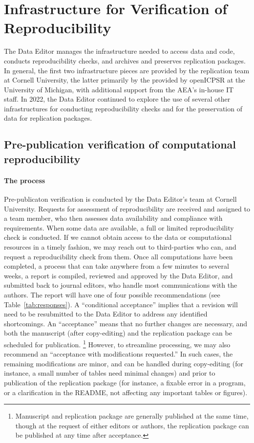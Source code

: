 
\section{Infrastructure for Verification of Reproducibility}
\label{sec:infrastructure}

The Data Editor manages the infrastructure needed to access data and code, conducts reproducibility checks, and archives and preserves replication packages. In general, the first two infrastructure pieces are provided by the replication team at Cornell University, the latter primarily by the  \aeadcr{} provided by openICPSR at the University of Michigan, with additional support from the AEA's in-house IT staff. In 2022, the Data Editor continued to explore the use of several other infrastructures for  conducting reproducibility checks and for the preservation of data for replication packages.


\subsection{Pre-publication verification of computational reproducibility}
\label{sec:verification}

\paragraph{The process}

Pre-publicaton verification is conducted by the Data Editor's team at Cornell University. 
Requests for assessment of reproducibility are received and assigned to a team member, who then assesses data availability and compliance with requirements. When some data are available, a full or limited reproducibility check is conducted. If we cannot obtain access to the data or computational resources in a timely fashion, we may reach out to third-parties who can, and request a reproducibility check from them. Once all computations have been completed, a process that can take anywhere from a few minutes to several weeks, a report is compiled, reviewed and approved by the Data Editor, and submitted back to journal editors, who handle most communications with the authors. The report will have  one of four possible recommendations (see Table~\ref{tab:responses}). A ``conditional acceptance'' implies that a revision will need to be resubmitted to the Data Editor to address any identified shortcomings. An ``acceptance'' means that no further changes are necessary, and both the manuscript (after copy-editing) and the replication package can be scheduled for publication.%
%
\footnote{Manuscript and replication package are generally published at the same time, though at the request of either editors or authors, the replication package can be published at any time after acceptance.} 
%
However, to streamline processing, we may also recommend an ``acceptance with modifications requested.'' In such cases, the remaining modifications are minor, and can be handled during copy-editing (for instance, a small number of tables need minimal changes) and prior to publication of the replication package (for instance, a fixable error in a program, or a clarification in the README, not affecting any important tables or figures). 


